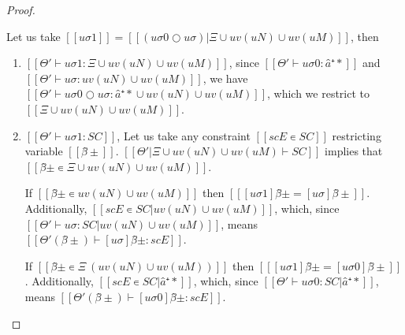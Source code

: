 \begin{proof}
\begin{caseof}
\begin{enumerate}
\begin{itemize}
                            Let us take $[[uσ1]] = [[(uσ0 ○ uσ)|Ξ ∪ uv(uN) ∪ uv(uM)]]$, then 
                            \begin{enumerate}
                                \item $[[Θ' ⊢ uσ1 : Ξ ∪ uv(uN) ∪ uv(uM)]]$,
                                    since $[[Θ' ⊢ uσ0 : {â⁺*}]]$ and 
                                    $[[ Θ' ⊢ uσ : uv(uN) ∪ uv(uM) ]]$, 
                                    we have 
                                    $[[Θ' ⊢ uσ0 ○ uσ : {â⁺*} ∪ uv(uN) ∪ uv(uM)]]$, 
                                    which we restrict to $[[Ξ ∪ uv(uN) ∪ uv(uM)]]$.
                                \item $[[Θ' ⊢ uσ1 : SC]]$,
                                    Let us take any constraint $[[scE ∊ SC]]$ restricting 
                                    variable $[[β̂±]]$.
                                    $[[Θ'|Ξ ∪ uv(uN) ∪ uv(uM) ⊢ SC]]$
                                    implies that $[[β̂± ∊ Ξ ∪ uv(uN) ∪ uv(uM)]]$.

                                    If $[[β̂± ∊ uv(uN) ∪ uv(uM)]]$ then 
                                    $[[ [uσ1]β̂± = [uσ]β̂± ]]$.
                                    Additionally, $[[scE ∊ SC | uv(uN) ∪ uv(uM)]]$,
                                    which, since $[[ Θ' ⊢ uσ : SC | uv(uN) ∪ uv(uM) ]]$,
                                    means $[[Θ'(β̂±) ⊢ [uσ]β̂± : scE]]$.

                                    If $[[β̂± ∊ Ξ \ (uv(uN) ∪ uv(uM))]]$ then
                                    $[[ [uσ1]β̂± = [uσ0]β̂± ]]$.
                                    Additionally, $[[scE ∊ SC | {â⁺*}]]$,
                                    which, since $[[ Θ' ⊢ uσ0 : SC | {â⁺*} ]]$,
                                    means $[[Θ'(β̂±) ⊢ [uσ0]β̂± : scE]]$.


\end{enumerate}
\end{itemize}
\end{enumerate}
\end{caseof}
\end{proof}
